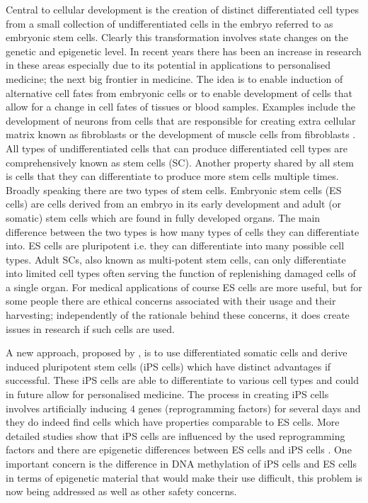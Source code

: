 Central to cellular development is the creation of distinct differentiated cell types from a small collection of undifferentiated cells in the embryo referred to as embryonic stem cells. Clearly this transformation involves state changes on the genetic and epigenetic level. In recent years there has been an increase in research in these areas especially due to its potential in applications to personalised medicine; the next big frontier in medicine. The idea is to enable induction of alternative cell fates from embryonic cells or to enable development of cells that allow for a change in cell fates of tissues or blood samples. Examples include the development of neurons from cells that are responsible for creating extra cellular matrix known as fibroblasts \citep{Vierbuchen:2010fa, Pang:2011ce} or the development of muscle cells from fibroblasts \citep{Ieda:2010ir, Efe:2011bpa}. All types of undifferentiated cells that can produce differentiated cell types are comprehensively known as stem cells (SC). Another property shared by all stem is cells that they can differentiate to produce more stem cells multiple times. Broadly speaking there are two types of stem cells. Embryonic stem cells (ES cells) are cells derived from an embryo in its early development and  adult (or somatic) stem cells which are found in fully developed organs. The main difference between the two types is how many types of cells they can differentiate into. ES cells are pluripotent i.e. they can differentiate into many possible cell types. Adult SCs, also known as multi-potent stem cells, can only differentiate into limited cell types often serving the function of replenishing damaged cells of a single organ. For medical applications of course ES cells are more useful, but for some people there are ethical concerns associated with their usage and their harvesting; independently of the rationale behind these concerns, it does create issues in research if such cells are used.

A new approach, proposed by \cite{Takahashi:2006hi}, is to use differentiated somatic cells and derive induced pluripotent stem cells (iPS cells) which have distinct advantages if successful. These iPS cells are able to differentiate to various cell types and could in future allow for personalised medicine. The process in creating iPS cells involves artificially inducing $4$ genes (reprogramming factors) for several days and they do indeed find cells which have properties comparable to ES cells. More detailed studies show that iPS cells are influenced by the used reprogramming factors and there are epigenetic differences between ES cells and iPS cells \citep{Carey:2011bs, Bock:2011kx}. One important concern is the difference in DNA methylation of iPS cells and ES cells in terms of epigenetic material that would make their use difficult, this problem is now being addressed \citep{Bagci:2013ey} as well as other safety concerns.

